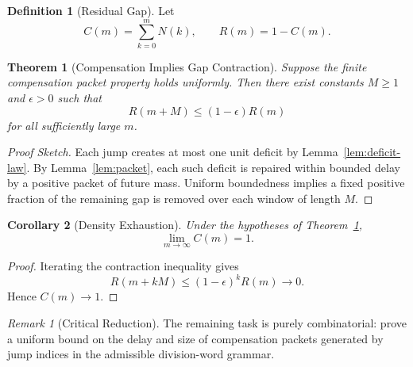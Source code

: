 \documentclass[12pt, oneside]{article}
\numberwithin{equation}{section}
\theoremstyle{definition}
\newtheorem{definition}{Definition}[section]
\theoremstyle{plain}
\newtheorem{theorem}{Theorem}[section]
\newtheorem{corollary}[theorem]{Corollary}
\theoremstyle{remark}
\newtheorem*{remark}{Remark}
\begin{document}

\begin{definition}[Residual Gap]
Let
\[
C(m)=\sum_{k=0}^{m}N(k),
\qquad
R(m)=1-C(m).
\]
\end{definition}


\begin{theorem}[Compensation Implies Gap Contraction]
\label{thm:gap-contraction}
Suppose the finite compensation packet property holds uniformly.
Then there exist constants $M\ge1$ and $\epsilon>0$ such that
\[
R(m+M)\le (1-\epsilon)R(m)
\]
for all sufficiently large $m$.
\end{theorem}

\begin{proof}[Proof Sketch]
Each jump creates at most one unit deficit by
Lemma~\ref{lem:deficit-law}. By Lemma~\ref{lem:packet}, each such deficit
is repaired within bounded delay by a positive packet of future mass.
Uniform boundedness implies a fixed positive fraction of the remaining
gap is removed over each window of length $M$.
\end{proof}


\begin{corollary}[Density Exhaustion]
\label{cor:density-exhaustion}
Under the hypotheses of Theorem~\ref{thm:gap-contraction},
\[
\lim_{m\to\infty} C(m)=1.
\]
\end{corollary}

\begin{proof}
Iterating the contraction inequality gives
\[
R(m+kM)\le (1-\epsilon)^kR(m)\to0.
\]
Hence $C(m)\to1$.
\end{proof}


\begin{remark}[Critical Reduction]
The remaining task is purely combinatorial: prove a uniform bound on the
delay and size of compensation packets generated by jump indices in the
admissible division-word grammar.
\end{remark}



\clearpage


\end{document}
